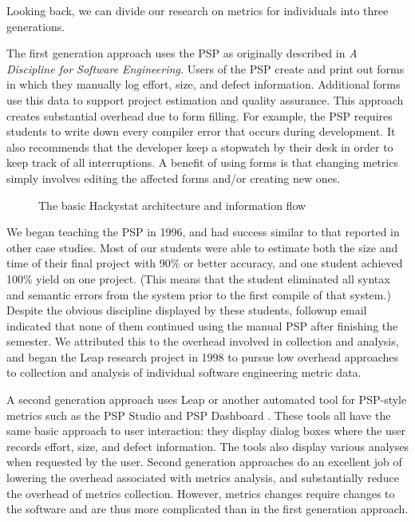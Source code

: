 \documentclass[12pt]{article}
\begin{document}
Looking back, we can divide our research on metrics for individuals into
three generations.  

The first generation approach uses the PSP as originally described in {\em
  A Discipline for Software Engineering.}  Users of the PSP create and
print out forms in which they manually log effort, size, and defect
information.  Additional forms use this data to support project estimation
and quality assurance.  This approach creates substantial overhead due
to form filling.  For example, the PSP requires
students to write down every compiler error that occurs during development.
It also recommends that the developer keep a stopwatch by their desk in
order to keep track of all interruptions.  A benefit of using forms is
that changing metrics simply involves editing the affected forms and/or
creating new ones. 

\begin{figure*}[tbp]
 {\centerline {}}
 \caption{The basic Hackystat architecture and information flow}
 \label{fig:hackystatarchitecture}
\end{figure*}

We began teaching the PSP in 1996, and had success similar to that reported
in other case studies.  Most of our students were able to estimate both the
size and time of their final project with 90\% or better accuracy, and one
student achieved 100\% yield on one project. (This means that the student
eliminated all syntax and semantic errors from the system prior to the
first compile of that system.) Despite the obvious discipline displayed by
these students, followup email indicated that none of them continued using
the manual PSP after finishing the semester.  We attributed this to the
overhead involved in collection and analysis, and began the Leap research
project in 1998 to pursue low overhead approaches to collection and
analysis of individual software engineering metric data.

A second generation approach uses Leap or another automated tool for
PSP-style metrics such as the PSP Studio \cite{Henry97} and PSP Dashboard
\cite{Tuma00}.  These tools all have the same basic approach to user
interaction: they display dialog boxes where the user records effort, size,
and defect information. The tools also display various analyses when
requested by the user.  Second generation approaches do an excellent job of
lowering the overhead associated with metrics analysis, and substantially
reduce the overhead of metrics collection. However, metrics changes require
changes to the software and are thus more complicated than in the first
generation approach.
\end{document}
